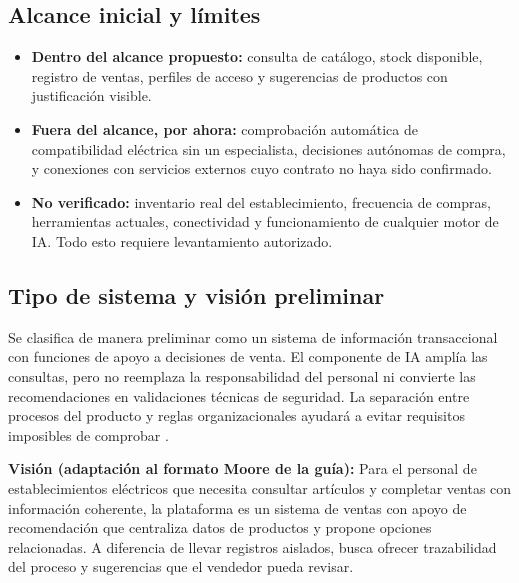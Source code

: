 \subsection*{Alcance inicial y l\'imites}
\begin{itemize}
\item \textbf{Dentro del alcance propuesto:} consulta de cat\'alogo, stock disponible, registro de ventas, perfiles de acceso y sugerencias de productos con justificaci\'on visible.
\item \textbf{Fuera del alcance, por ahora:} comprobaci\'on autom\'atica de compatibilidad el\'ectrica sin un especialista, decisiones aut\'onomas de compra, y conexiones con servicios externos cuyo contrato no haya sido confirmado.
\item \textbf{No verificado:} inventario real del establecimiento, frecuencia de compras, herramientas actuales, conectividad y funcionamiento de cualquier motor de IA. Todo esto requiere levantamiento autorizado.
\end{itemize}

\subsection*{Tipo de sistema y visi\'on preliminar}
Se clasifica de manera preliminar como un sistema de informaci\'on transaccional con funciones de apoyo a decisiones de venta. El componente de IA ampl\'ia las consultas, pero no reemplaza la responsabilidad del personal ni convierte las recomendaciones en validaciones t\'ecnicas de seguridad. La separaci\'on entre procesos del producto y reglas organizacionales ayudar\'a a evitar requisitos imposibles de comprobar \cite{pohl2025,iso29148}.

\textbf{Visi\'on (adaptaci\'on al formato Moore de la gu\'ia):} Para el personal de establecimientos el\'ectricos que necesita consultar art\'iculos y completar ventas con informaci\'on coherente, la plataforma es un sistema de ventas con apoyo de recomendaci\'on que centraliza datos de productos y propone opciones relacionadas. A diferencia de llevar registros aislados, busca ofrecer trazabilidad del proceso y sugerencias que el vendedor pueda revisar.

